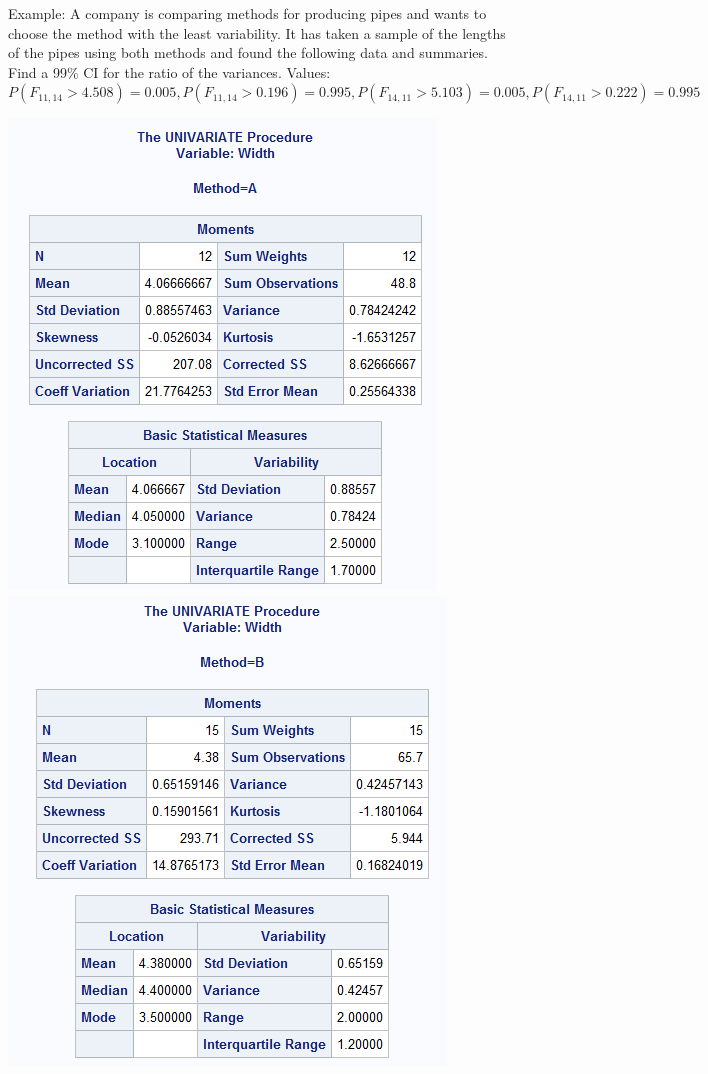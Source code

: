 Example:   A company is comparing methods for producing pipes and wants to choose the method with the least variability. It has taken a sample of the lengths of the pipes using both methods and found the following data and summaries.  Find a 99\% CI for the ratio of the variances.  Values: $P(F_{11,14}>4.508)=0.005,P(F_{11,14}>0.196)=0.995,P(F_{14,11}>5.103)=0.005,P(F_{14,11}>0.222)=0.995$
\begin{center}
\includegraphics[scale=0.6]{pipes1}\includegraphics[scale=0.6]{pipes2}
\end{center}

